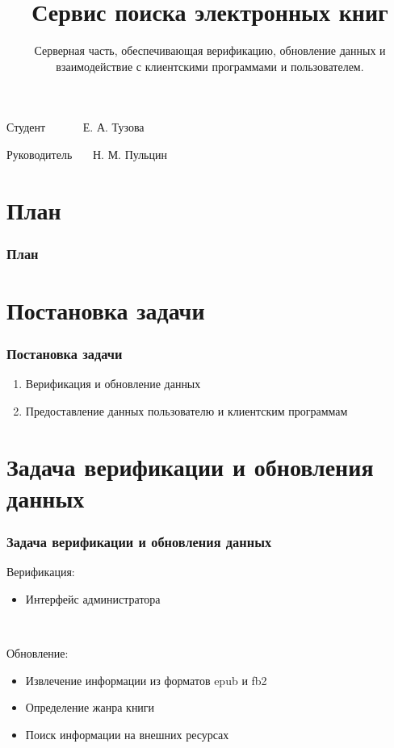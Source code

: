 \documentclass[handout]{beamer}
\title{Сервис поиска электронных книг }
\subtitle{Серверная часть, обеспечивающая верификацию, обновление данных и взаимодействие с клиентскими программами и пользователем.}
\date{}
\begin{document}
\begin{frame}
  \titlepage

  \begin{flushright}
    Студент~~~~~~  Е. А. Тузова
  
    Руководитель~~~  Н. М. Пульцин

  \end{flushright}
\end{frame}

\section*{План}
  \begin{frame}
    \frametitle{План}
    \tableofcontents[pausesections]

  \end{frame}

\section{Постановка задачи}
  \begin{frame}

    \frametitle{Постановка задачи}
    \begin{enumerate}
      \item Верификация и обновление данных
      \item Предоставление данных пользователю и клиентским программам
    \end{enumerate}
  \end{frame}

\section{Задача верификации и обновления данных}
  \begin{frame}
    \frametitle{Задача верификации и обновления данных}
  
    Верификация:
    \begin{itemize}
      \item Интерфейс администратора
    \end{itemize}

    \ 
    
  	Обновление:
    \begin{itemize}
      \item Извлечение информации из форматов epub и fb2 
      \item Определение жанра книги
      \item Поиск информации на внешних ресурсах
    \end{itemize}

  \end{frame}
  
\end{document}
